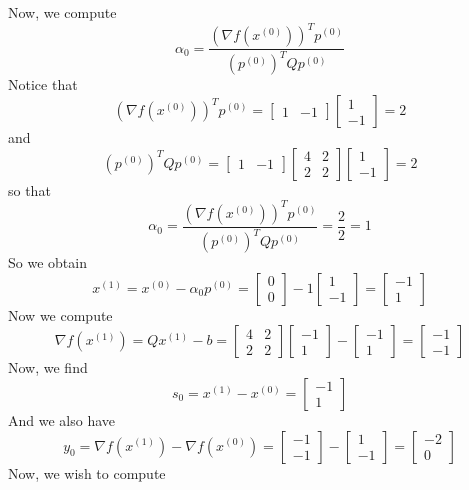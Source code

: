 \documentclass[12pt]{article}
\begin{document}
Now, we compute
\[
\alpha_0 = \frac{(\nabla f(x^{(0)}))^Tp^{(0)}}{(p^{(0)})^TQp^{(0)}}
\] Notice that
\[
(\nabla f(x^{(0)}))^Tp^{(0)} = \begin{bmatrix} 1 & -1
\end{bmatrix} \begin{bmatrix} 1 \\ -1
\end{bmatrix} = 2
\] and
\[
(p^{(0)})^TQp^{(0)} = \begin{bmatrix} 1 & -1
\end{bmatrix} \begin{bmatrix}
4 & 2\\
2 & 2
\end{bmatrix} \begin{bmatrix} 1 \\ -1
\end{bmatrix}  = 2
\] so that
\[
\alpha_0 = \frac{(\nabla f(x^{(0)}))^Tp^{(0)}}{(p^{(0)})^TQp^{(0)}} = \frac{2}{2} = 1
\] So we obtain
\[
x^{(1)} = x^{(0)} - \alpha_0 p^{(0)} =
\begin{bmatrix}
0\\
0
\end{bmatrix} - 1 \begin{bmatrix}
1\\
-1
\end{bmatrix} = \begin{bmatrix}
-1\\
1
\end{bmatrix}
\] Now we compute 
\[
\nabla f(x^{(1)}) = Qx^{(1)} - b = \begin{bmatrix}
4 & 2\\
2 & 2
\end{bmatrix} \begin{bmatrix}
-1\\
1
\end{bmatrix} - \begin{bmatrix}
-1\\
1
\end{bmatrix} = \begin{bmatrix}
-1 \\ -1
\end{bmatrix}
\]Now, we find
\[
s_0 = x^{(1)} - x^{(0)} = \begin{bmatrix}
-1\\
1
\end{bmatrix}
\] And we also have
\[
y_0 = \nabla f(x^{(1)}) - \nabla f(x^{(0)}) = \begin{bmatrix}
-1 \\ -1
\end{bmatrix} - \begin{bmatrix}
1\\
-1
\end{bmatrix} = 
\begin{bmatrix}
-2\\
0
\end{bmatrix}
\] Now, we wish to compute
\end{document}
